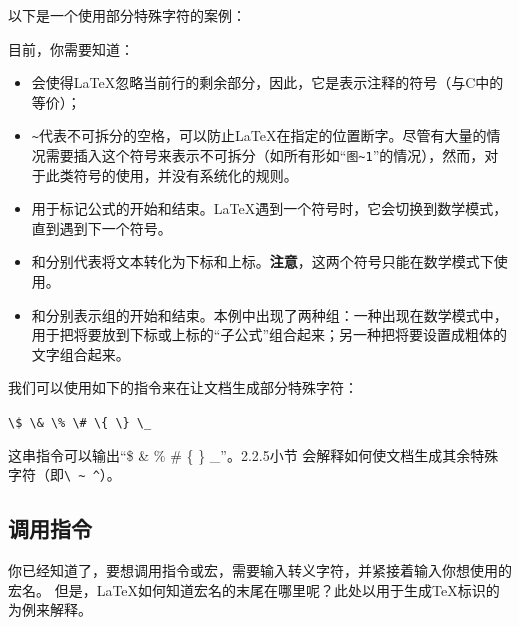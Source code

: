 
以下是一个使用部分特殊字符的案例：


目前，你需要知道：

\begin{itemize}
    \item \dm{\%}会使得\LaTeX 忽略当前行的剩余部分，因此，它是表示注释的符号（与C中的\dm{//}等价）；
    \item \verb+~+代表不可拆分的空格，可以防止\LaTeX 在指定的位置断字。尽管有大量的情况需要插入这个符号来表示不可拆分（如所有形如“\verb+图~1+”的情况），然而，对于此类符号的使用，并没有系统化的规则。
    \item \dm{\$}用于标记公式的开始和结束。\LaTeX 遇到一个\dm{\$}符号时，它会切换到数学模式，直到遇到下一个\dm{\$}符号。
    \item \dm{\_}和\dm{\^{}}分别代表将文本转化为下标和上标。\textbf{注意}，这两个符号只能在数学模式下使用。
    \item \dm{\{}和\dm{\}}分别表示组的开始和结束。本例中出现了两种组：一种出现在数学模式中，用于把将要放到下标或上标的“子公式”组合起来；另一种把将要设置成粗体的文字组合起来。
\end{itemize}

我们可以使用如下的指令来在让文档生成部分特殊字符：

\begin{dmd}
    \verb+\$ \& \% \# \{ \} \_+
\end{dmd}

这串指令可以输出“\$ \& \% \# \{ \} \_”。2.2.5小节%
会解释如何使文档生成其余特殊字符（即\verb+\ ~ ^+）。

\subsection{调用指令}

你已经知道了，要想调用指令或宏，需要输入转义字符，并紧接着输入你想使用的宏名。%
但是，\LaTeX 如何知道宏名的末尾在哪里呢？此处以用于生成\TeX 标识的为例来解释。


